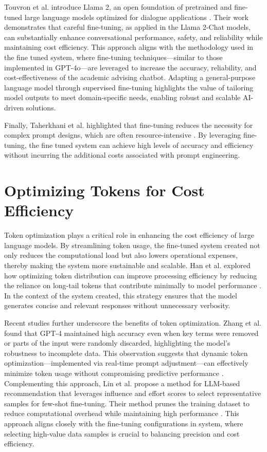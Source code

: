 \documentclass[12pt,oneside,openany]{report}
\begin{document}
Touvron et al. introduce Llama 2, an open foundation of pretrained and fine-tuned large language models optimized for dialogue applications \cite{touvron2023llama2openfoundation}. Their work demonstrates that careful fine-tuning, as applied in the Llama 2-Chat models, can substantially enhance conversational performance, safety, and reliability while maintaining cost efficiency. This approach aligns with the methodology used in the fine tuned system, where fine-tuning techniques—similar to those implemented in GPT-4o—are leveraged to increase the accuracy, reliability, and cost-effectiveness of the academic advising chatbot. Adapting a general-purpose language model through supervised fine-tuning highlights the value of tailoring model outputs to meet domain-specific needs, enabling robust and scalable AI-driven solutions.

Finally, Taherkhani et al. highlighted that fine-tuning reduces the necessity for complex prompt designs, which are often resource-intensive \cite{taherkhani2024epiccosteffectivesearchbasedprompt}. By leveraging fine-tuning, the fine tuned system can achieve high levels of accuracy and efficiency without incurring the additional costs associated with prompt engineering.


\section{Optimizing Tokens for Cost Efficiency}

Token optimization plays a critical role in enhancing the cost efficiency of large language models. By streamlining token usage, the fine-tuned system created not only reduces the computational load but also lowers operational expenses, thereby making the system more sustainable and scalable. Han et al. explored how optimizing token distribution can improve processing efficiency by reducing the reliance on long-tail tokens that contribute minimally to model performance \cite{han2023understandingincontextlearningsupportive}. In the context of the system created, this strategy ensures that the model generates concise and relevant responses without unnecessary verbosity.

Recent studies further underscore the benefits of token optimization. Zhang et al. found that GPT-4 maintained high accuracy even when key terms were removed or parts of the input were randomly discarded, highlighting the model's robustness to incomplete data. This observation suggests that dynamic token optimization—implemented via real-time prompt adjustment—can effectively minimize token usage without compromising predictive performance \cite{Zhang2024Comparison}. Complementing this approach, Lin et al. propose a method for LLM-based recommendation that leverages influence and effort scores to select representative samples for few-shot fine-tuning. Their method prunes the training dataset to reduce computational overhead while maintaining high performance \cite{lin2024data}. This approach aligns closely with the fine-tuning configurations in system, where selecting high-value data samples is crucial to balancing precision and cost efficiency.
\end{document}
